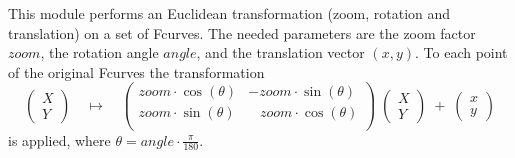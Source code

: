 This module performs an Euclidean transformation (zoom, rotation and
translation) on a set of Fcurves. The needed
parameters are the zoom factor $zoom$, the rotation angle
$angle$, and the translation vector $(x,y)$. To
each point of the original Fcurves the transformation
$$\left( \begin{array}{c} X \\ Y \end{array} \right) \quad
\mapsto \quad 
\left( \begin{array}{cc} zoom \cdot \cos(\theta) & - zoom \cdot\sin(\theta) \\
zoom \cdot \sin(\theta) & \;\;\;zoom\cdot\cos(\theta) \\ \end{array} \right) \;
\left( \begin{array}{c} X \\ Y \end{array} \right) \;+\;
\left( \begin{array}{c} x \\ y  \end{array} \right)$$
is applied,
where $\displaystyle \theta = angle \cdot \frac{\pi}{180}$.


